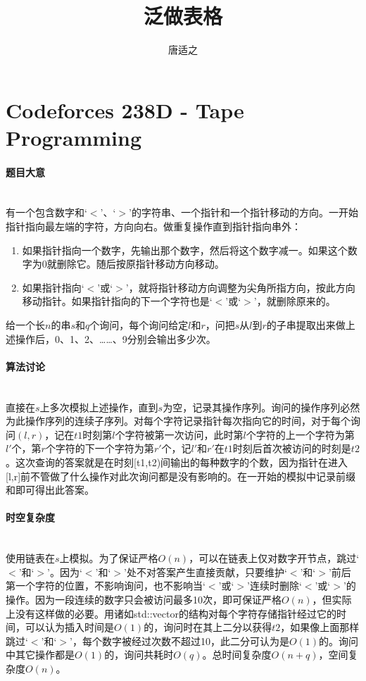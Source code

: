 \documentclass[UTF8]{ctexart}
\title{泛做表格}
\author{唐适之}
\date{}
\newcommand{\myparagraph}[1]{\paragraph{#1}\mbox{}\\}
\theoremstyle{nonumberplain}
\begin{document}
	
	\maketitle
	
	\tableofcontents
	\vfill
	\newpage
	
	\section{Codeforces 238D - Tape Programming}
	
		\myparagraph{题目大意}
		
			有一个包含数字和‘$<$’、‘$>$’的字符串、一个指针和一个指针移动的方向。一开始指针指向最左端的字符，方向向右。做重复操作直到指针指向串外：
			
			\begin{enumerate}
				\item 如果指针指向一个数字，先输出那个数字，然后将这个数字减一。如果这个数字为0就删除它。随后按原指针移动方向移动。
				\item 如果指针指向‘$<$’或‘$>$’，就将指针移动方向调整为尖角所指方向，按此方向移动指针。如果指针指向的下一个字符也是‘$<$’或‘$>$’，就删除原来的。
			\end{enumerate}
			
			给一个长$n$的串$s$和$q$个询问，每个询问给定$l$和$r$，问把$s$从$l$到$r$的子串提取出来做上述操作后，0、1、2、……、9分别会输出多少次。
		
		\myparagraph{算法讨论}
		
			直接在$s$上多次模拟上述操作，直到$s$为空，记录其操作序列。询问的操作序列必然为此操作序列的连续子序列。对每个字符记录指针每次指向它的时间，对于每个询问$(l,r)$，记在$t1$时刻第$l$个字符被第一次访问，此时第$l$个字符的上一个字符为第$l'$个，第$r$个字符的下一个字符为第$r'$个，记$l'$和$r'$在$t1$时刻后首次被访问的时刻是$t2$。这次查询的答案就是在时刻[t1,t2)间输出的每种数字的个数，因为指针在进入[l,r]前不管做了什么操作对此次询问都是没有影响的。在一开始的模拟中记录前缀和即可得出此答案。 
		
		\myparagraph{时空复杂度}
		
			使用链表在$s$上模拟。为了保证严格$O(n)$，可以在链表上仅对数字开节点，跳过‘$<$’和‘$>$’。因为‘$<$’和‘$>$’处不对答案产生直接贡献，只要维护‘$<$’和‘$>$’前后第一个字符的位置，不影响询问，也不影响当‘$<$’或‘$>$’连续时删除‘$<$’或‘$>$’的操作。因为一段连续的数字只会被访问最多10次，即可保证严格$O(n)$，但实际上没有这样做的必要。用诸如std::vector的结构对每个字符存储指针经过它的时间，可以认为插入时间是$O(1)$的，询问时在其上二分以获得$t2$，如果像上面那样跳过‘$<$’和‘$>$’，每个数字被经过次数不超过10，此二分可认为是$O(1)$的。询问中其它操作都是$O(1)$的，询问共耗时$O(q)$。总时间复杂度$O(n+q)$，空间复杂度$O(n)$。
	
\end{document}

